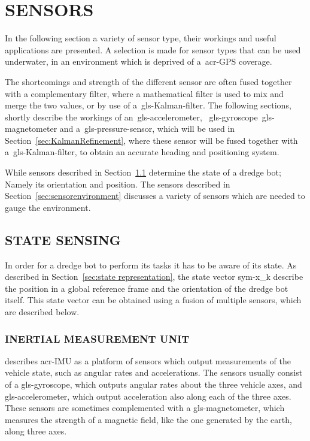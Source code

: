 

\section{SENSORS}\label{sec:sensors}

In the following section a variety of sensor type, their workings and useful applications are presented. A selection is
made for sensor types that can be used underwater, in an environment which is deprived of a~\gls{acr-GPS} coverage.

The shortcomings and strength of the different sensor are often fused together with a complementary filter, where a
mathematical filter is used to mix and merge the two values, or by use of a~\gls{gls-Kalman-filter}. The
following sections, shortly describe the workings of an~\gls{gls-accelerometer},
~\gls{gls-gyroscope}~\gls{gls-magnetometer} and a~\gls{gls-pressure-sensor}, which will be used in
Section~\ref{sec:KalmanRefinement}, where these sensor will be fused together with a~\gls{gls-Kalman-filter}, to obtain
an accurate heading and positioning system.

While sensors described in Section~\ref{sec:sensorstate} determine the state of a dredge bot; Namely its orientation and
position. The sensors described in Section~\ref{sec:sensorenvironment} discusses a variety of sensors which are needed
to gauge the environment.

\subsection{STATE SENSING}\label{sec:sensorstate}

In order for a dredge bot to perform its tasks it has to be aware of its state. As described in Section~\ref{sec:state
representation}, the state vector \gls{sym-x_k} describe the position in a global reference frame and the orientation of
the dredge bot itself. This state vector can be obtained using a fusion of multiple sensors, which are described below.

\subsubsection{INERTIAL MEASUREMENT UNIT}

\citet{leccadito_kalman_2013} describes \gls{acr-IMU} as a platform of sensors which output measurements of the
vehicle state, such as angular rates and accelerations. The sensors usually consist of a \gls{gls-gyroscope}, which
outputs angular rates about the three vehicle axes, and \gls{gls-accelerometer}, which output acceleration also along
each of the three axes. These sensors are sometimes complemented with a \gls{gls-magnetometer}, which measures the
strength of a magnetic field, like the one generated by the earth, along three axes.

